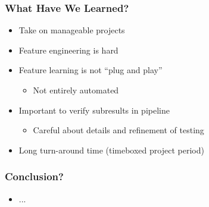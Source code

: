 \begin{frame}
    \frametitle{What Have We Learned?}
    \begin{itemize}
			\item Take on manageable projects
			\item Feature engineering is hard
			\item Feature learning is not ``plug and play''
			\begin{itemize}
				\item Not entirely automated
			\end{itemize}
			\item Important to verify subresults in pipeline
			\begin{itemize}
				\item Careful about details and refinement of testing
			\end{itemize}
			\item Long turn-around time (timeboxed project period)
		\end{itemize}
\end{frame}

\begin{frame}
    \frametitle{Conclusion?}
    \begin{itemize}
			\item ...
		\end{itemize}
\end{frame}
